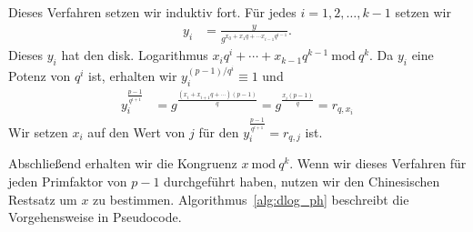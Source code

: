 \documentclass[
  a4paper,
  11pt,
]{scrartcl}
\theoremstyle{plain}
\theoremstyle{definition}
\theoremstyle{remark}
\newcommand{\Mod}[1]{\ \mathrm{mod}\ #1}
\begin{document}
Dieses Verfahren setzen wir induktiv fort. Für jedes $i = 1, 2, \ldots, k-1$
setzen wir
\begin{align*}
  y_i & = \frac{y}{g^{x_0 + x_1 q + \cdots x_{i-1} q^{i-1}}}.
\end{align*}
Dieses $y_i$ hat den disk. Logarithmus
$x_i q^i + \cdots + x_{k-1} q^{k-1} \Mod{q^k}$. Da $y_i$ eine Potenz von $q^i$
ist, erhalten wir $y_i^{(p-1)/q^i} \equiv 1$ und
\begin{align*}
  y_i^{\frac{p-1}{q^{i+1}}} &
    = g^{\frac{(x_i + x_{i+1} q + \cdots) (p-1)}{q}}
    = g^{\frac{x_i (p-1)}{q}}
    = r_{q, x_i}
\end{align*}
Wir setzen $x_i$ auf den Wert von $j$ für den
$y_i^{\frac{p-1}{q^{i+1}}} = r_{q, j}$ ist.

Abschließend erhalten wir die Kongruenz $x \Mod{q^k}$. Wenn wir dieses Verfahren
für jeden Primfaktor von $p-1$ durchgeführt haben, nutzen wir den Chinesischen
Restsatz um $x$ zu bestimmen. Algorithmus~\ref{alg:dlog_ph} beschreibt die
Vorgehensweise in Pseudocode.
\end{document}
